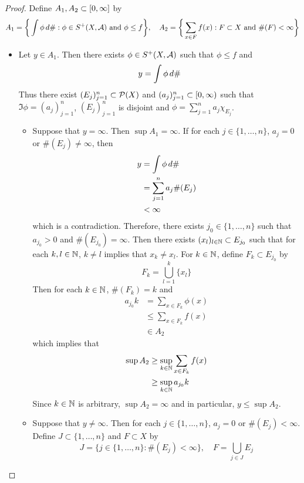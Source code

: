 \documentclass{book}
\begin{document}
	\begin{proof}
		Define $A_1, A_2 \subset [0,\infty]$ by 
		$$A_1 = \bigg \{\int \phi \, d \#: \phi \in S^+(X, \mathcal{A}) \text{ and } \phi \leq f \bigg \}, \quad A_2 = \bigg \{\sum_{x \in F}f(x): F \subset X \text{ and } \#(F) < \infty \bigg \}$$ 
		\begin{itemize}
			\item Let $y \in A_1$. Then there exists $\phi \in S^+(X, \mathcal{A})$ such that $\phi \leq f$ and 
			$$y = \int \phi \, d \#$$  
			Thus there exist $(E_j)_{j=1}^n \subset \mathcal{P}(X)$ and $(a_j)_{j =1}^n \subset [0,\infty)$ such that $\Im \phi = (a_j)_{j =1}^n$, $(E_j)_{j=1}^n$ is disjoint and $\phi = \sum\limits_{j=1}^n a_j \chi_{E_j}$. \\
			\begin{itemize}
				\item Suppose that $y = \infty$. Then $\sup A_1 = \infty$. If for each $j \in \{1, \ldots, n\}$, $a_j = 0$ or $\#(E_j) \neq \infty$, then 
				\begin{align*}
					y
					& = \int \phi \, d \# \\
					& = \sum_{j=1}^n a_j \#(E_j) \\
					& < \infty 
				\end{align*}
				which is a contradiction. Therefore, there exists $j_0 \in \{1, \ldots, n\}$ such that $a_{j_0} >0$ and $\#(E_{j_0}) = \infty$. Then there exists $(x_l)_{l \in \mathbb{N}} \subset E_{j_0}$ such that for each $k, l \in \mathbb{N}$, $k \neq l$ implies that $x_k \neq x_l$. For $k \in \mathbb{N}$, define $F_k \subset E_{j_0}$ by 
				$$F_k = \bigcup_{l=1}^k \{x_l\}$$
				Then for each $k \in \mathbb{N}$, $\#(F_k) = k$ and 
				\begin{align*}
					a_{j_0} k
					& = \sum_{x \in F_k} \phi(x) \\
					& \leq \sum_{x \in F_k}f(x) \\
					& \in A_2
				\end{align*}
				which implies that
				\begin{align*}
					\sup A_2
					& \geq \sup_{k \in \mathbb{N}}  \sum_{x \in F_k}f(x) \\
					& \geq \sup_{k \in \mathbb{N}} a_{j_0} k
				\end{align*}
				Since $k \in \mathbb{N}$ is arbitrary, $\sup A_2 = \infty$ and in particular, $y \leq \sup A_2$.\\
				\item Suppose that $y \neq \infty$. Then for each $j \in \{1, \ldots, n\}$, $a_j = 0$ or $\#(E_j) < \infty$. Define $J \subset \{1, \ldots, n\}$ and $F \subset X$ by 
				$$J = \{j \in \{1, \ldots, n\}: \#(E_j) < \infty \}, \quad F = \bigcup_{j \in J}E_j$$

\end{itemize}
\end{itemize}
\end{proof}
\end{document}
